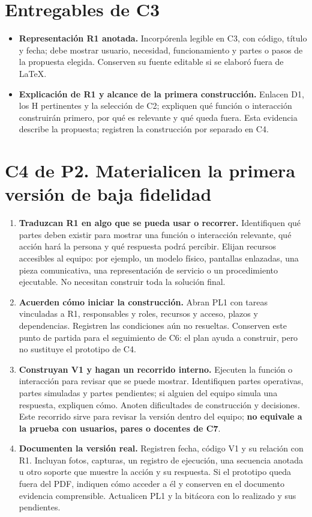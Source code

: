 \section*{Entregables de C3}
\begin{itemize}
\item \textbf{Representación R1 anotada.} Incorpórenla legible en C3, con código, título y fecha; debe mostrar usuario, necesidad, funcionamiento y partes o pasos de la propuesta elegida. Conserven su fuente editable si se elaboró fuera de LaTeX.
\item \textbf{Explicación de R1 y alcance de la primera construcción.} Enlacen D1, los H pertinentes y la selección de C2; expliquen qué función o interacción construirán primero, por qué es relevante y qué queda fuera. Esta evidencia describe la propuesta; registren la construcción por separado en C4.
\end{itemize}

\newpage
\section*{C4 de P2. Materialicen la primera versión de baja fidelidad}
\begin{enumerate}[resume=pasos]
\item \textbf{Traduzcan R1 en algo que se pueda usar o recorrer.} Identifiquen qué partes deben existir para mostrar una función o interacción relevante, qué acción hará la persona y qué respuesta podrá percibir. Elijan recursos accesibles al equipo: por ejemplo, un modelo físico, pantallas enlazadas, una pieza comunicativa, una representación de servicio o un procedimiento ejecutable. No necesitan construir toda la solución final.
\item \textbf{Acuerden cómo iniciar la construcción.} Abran PL1 con tareas vinculadas a R1, responsables y roles, recursos y acceso, plazos y dependencias. Registren las condiciones aún no resueltas. Conserven este punto de partida para el seguimiento de C6: el plan ayuda a construir, pero no sustituye el prototipo de C4.
\item \textbf{Construyan V1 y hagan un recorrido interno.} Ejecuten la función o interacción para revisar que se puede mostrar. Identifiquen partes operativas, partes simuladas y partes pendientes; si alguien del equipo simula una respuesta, expliquen cómo. Anoten dificultades de construcción y decisiones. Este recorrido sirve para revisar la versión dentro del equipo; \textbf{no equivale a la prueba con usuarios, pares o docentes de C7}.
\item \textbf{Documenten la versión real.} Registren fecha, código V1 y su relación con R1. Incluyan fotos, capturas, un registro de ejecución, una secuencia anotada u otro soporte que muestre la acción y su respuesta. Si el prototipo queda fuera del PDF, indiquen cómo acceder a él y conserven en el documento evidencia comprensible. Actualicen PL1 y la bitácora con lo realizado y sus pendientes.
\end{enumerate}

